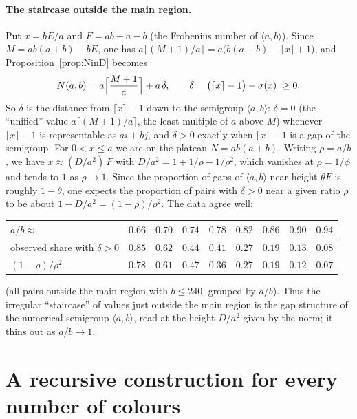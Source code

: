 \documentclass[11pt,a4paper]{article}
\theoremstyle{definition}
\theoremstyle{remark}
\begin{document}
\paragraph{The staircase outside the main region.} Put $x=bE/a$ and $F=ab-a-b$ (the Frobenius number of $\langle a,b\rangle$). Since $M=ab(a+b)-bE$, one has $a\lceil (M+1)/a\rceil=a\bigl(b(a+b)-\lceil x\rceil+1\bigr)$, and Proposition~\ref{prop:NinD} becomes
\[
  N(a,b)=a\Bigl\lceil\frac{M+1}{a}\Bigr\rceil+a\,\delta,\qquad
  \delta=\bigl(\lceil x\rceil-1\bigr)-\sigma(x)\ \ge0 .
\]
So $\delta$ is the distance from $\lceil x\rceil-1$ down to the semigroup $\langle a,b\rangle$: $\delta=0$ (the ``unified'' value $a\lceil(M+1)/a\rceil$, the least multiple of $a$ above $M$) whenever $\lceil x\rceil-1$ is representable as $ai+bj$, and $\delta>0$ exactly when $\lceil x\rceil-1$ is a gap of the semigroup. For $0<x\le a$ we are on the plateau $N=ab(a+b)$. Writing $\rho=a/b$, we have $x\approx (D/a^2)\,F$ with $D/a^2=1+1/\rho-1/\rho^2$, which vanishes at $\rho=1/\phi$ and tends to $1$ as $\rho\to1$. Since the proportion of gaps of $\langle a,b\rangle$ near height $\theta F$ is roughly $1-\theta$, one expects the proportion of pairs with $\delta>0$ near a given ratio $\rho$ to be about $1-D/a^2=(1-\rho)/\rho^2$. The data agree well:
\begin{center}
\small
\begin{tabular}{lcccccccc}
\toprule
$a/b\approx$ & $0.66$ & $0.70$ & $0.74$ & $0.78$ & $0.82$ & $0.86$ & $0.90$ & $0.94$\\
\midrule
observed share with $\delta>0$ & $0.85$ & $0.62$ & $0.44$ & $0.41$ & $0.27$ & $0.19$ & $0.13$ & $0.08$\\
$(1-\rho)/\rho^2$ & $0.78$ & $0.61$ & $0.47$ & $0.36$ & $0.27$ & $0.19$ & $0.12$ & $0.07$\\
\bottomrule
\end{tabular}
\end{center}
(all pairs outside the main region with $b\le240$, grouped by $a/b$). Thus the irregular ``staircase'' of values just outside the main region is the gap structure of the numerical semigroup $\langle a,b\rangle$, read at the height $D/a^2$ given by the norm; it thins out as $a/b\to1$.

\clearpage
\section{A recursive construction for every number of colours}\label{sec:rec}
\end{document}
